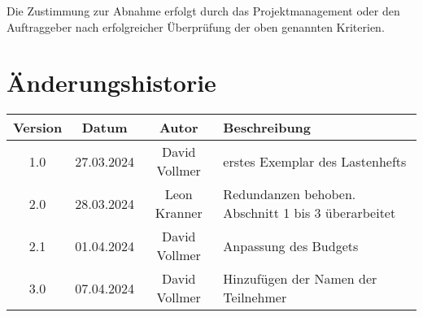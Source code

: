 \documentclass{article}
\begin{document}
Die Zustimmung zur Abnahme erfolgt durch das Projektmanagement oder den Auftraggeber nach erfolgreicher Überprüfung der oben genannten Kriterien.


\section{Änderungshistorie}
\begin{tabular}{|c|c|c|l|}
    \hline
    Version & Datum & Autor & Beschreibung \\
    \hline
    1.0 & 27.03.2024 & David Vollmer & erstes Exemplar des Lastenhefts \\
    \hline
    2.0 & 28.03.2024 & Leon Kranner & Redundanzen behoben. Abschnitt 1 bis 3 überarbeitet \\
    \hline
    2.1 & 01.04.2024 & David Vollmer & Anpassung des Budgets \\
    \hline
    3.0 & 07.04.2024 & David Vollmer & Hinzufügen der Namen der Teilnehmer \\
    \hline
\end{tabular}
\end{document}
